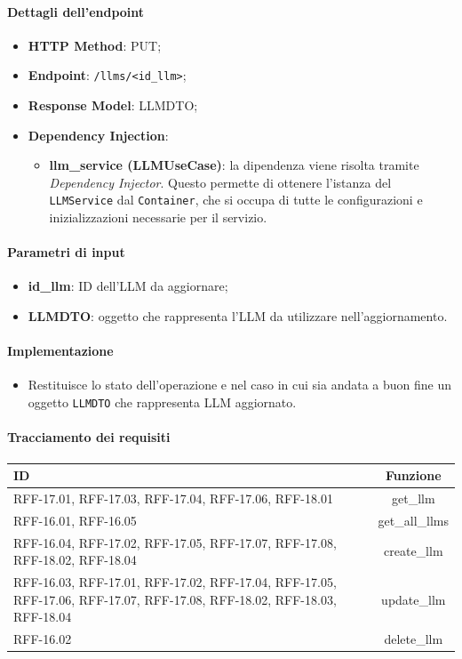 \paragraph{Dettagli dell'endpoint}
\begin{itemize}
    \item \textbf{HTTP Method}: PUT;
    \item \textbf{Endpoint}: \texttt{/llms/<id\_llm>};
    \item \textbf{Response Model}: LLMDTO;
    \item \textbf{Dependency Injection}:
    \begin{itemize}
        \item \textbf{llm\_service (LLMUseCase)}: la dipendenza viene risolta tramite \textit{Dependency Injector}. Questo permette di ottenere l'istanza del \texttt{LLMService} dal \texttt{Container}, che si occupa di tutte le configurazioni e inizializzazioni necessarie per il servizio.
    \end{itemize}
\end{itemize}

\paragraph{Parametri di input}
\begin{itemize}
    \item \textbf{id\_llm}: ID dell'LLM da aggiornare;
    \item \textbf{LLMDTO}: oggetto che rappresenta l'LLM da utilizzare nell'aggiornamento.
\end{itemize}

\paragraph{Implementazione}
\begin{itemize}
    \item Restituisce lo stato dell'operazione e nel caso in cui sia andata a buon fine un oggetto \texttt{LLMDTO} che rappresenta LLM aggiornato.
\end{itemize}

\paragraph{Tracciamento dei requisiti}
\begin{tabularx}{\textwidth}{|X|c|}
    \hline
    \textbf{ID} & \textbf{Funzione} \\
    \hline
        RFF-17.01, RFF-17.03, RFF-17.04, RFF-17.06, RFF-18.01 & get\_llm\\
   \hline
        RFF-16.01, RFF-16.05 & get\_all\_llms\\
   \hline
        RFF-16.04, RFF-17.02, RFF-17.05, RFF-17.07, RFF-17.08, RFF-18.02, RFF-18.04  & create\_llm\\
   \hline
        RFF-16.03, RFF-17.01, RFF-17.02, RFF-17.04, RFF-17.05, RFF-17.06, RFF-17.07, RFF-17.08, RFF-18.02, RFF-18.03, RFF-18.04 & update\_llm\\
   \hline
        RFF-16.02 & delete\_llm\\
   \hline
\end{tabularx}